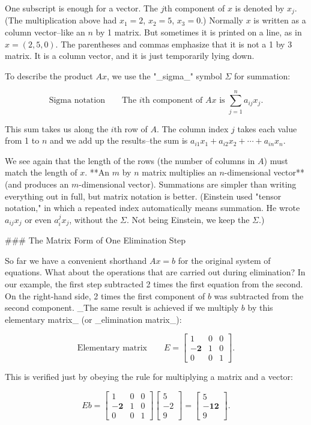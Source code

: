 One subscript is enough for a vector. The \(j\)th component of \(x\) is denoted by \(x_{j}\). (The multiplication above had \(x_{1}=2\), \(x_{2}=5\), \(x_{3}=0\).) Normally \(x\) is written as a column vector--like an \(n\) by 1 matrix. But sometimes it is printed on a line, as in \(x=(2,5,0)\). The parentheses and commas emphasize that it is not a 1 by 3 matrix. It is a column vector, and it is just temporarily lying down.

To describe the product \(Ax\), we use the "_sigma_" symbol \(\Sigma\) for summation:

\[\text{{Sigma notation}}\qquad\text{The $i$th component of $Ax$ is }\sum_{j=1}^{n}a_{ij}x_{j}.\]

This sum takes us along the \(i\)th row of \(A\). The column index \(j\) takes each value from 1 to \(n\) and we add up the results--the sum is \(a_{i1}x_{1}+a_{i2}x_{2}+\cdots+a_{in}x_{n}\).

We see again that the length of the rows (the number of columns in \(A\)) must match the length of \(x\). **An \(m\) by \(n\) matrix multiplies an \(n\)-dimensional vector** (and produces an \(m\)-dimensional vector). Summations are simpler than writing everything out in full, but matrix notation is better. (Einstein used "tensor notation," in which a repeated index automatically means summation. He wrote \(a_{ij}x_{j}\) or even \(a_{i}^{j}x_{j}\), without the \(\Sigma\). Not being Einstein, we keep the \(\Sigma\).)

### The Matrix Form of One Elimination Step

So far we have a convenient shorthand \(Ax=b\) for the original system of equations. What about the operations that are carried out during elimination? In our example, the first step subtracted 2 times the first equation from the second. On the right-hand side, 2 times the first component of \(b\) was subtracted from the second component. _The same result is achieved if we multiply \(b\) by this elementary matrix_ (or _elimination matrix_):

\[\text{{Elementary matrix}}\qquad E=\begin{bmatrix}1&0&0\\ -\mathbf{2}&1&0\\ 0&0&1\end{bmatrix}.\]

This is verified just by obeying the rule for multiplying a matrix and a vector:

\[Eb=\begin{bmatrix}1&0&0\\ -\mathbf{2}&1&0\\ 0&0&1\end{bmatrix}\begin{bmatrix}5\\ -2\\ 9\end{bmatrix}=\begin{bmatrix}5\\ -\mathbf{12}\\ 9\end{bmatrix}.\]


